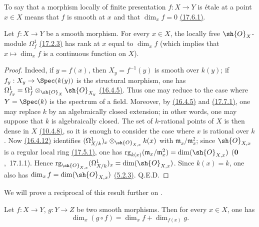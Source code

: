To say that a morphism locally of finite presentation $f:X\to Y$ is \'etale at a point $x\in X$ means that $f$ is smooth at $x$ and that $\dim_x f=0$ {\hyperlink{ega4.c04.thm.17-6-1}{(17.6.1)}}.

\begin{proposition}[17.10.2]
\label{IV.17.10.2}
Let $f:X\to Y$ be a smooth morphism.
For every $x\in X$, the locally free $\sh{O}_X$-module $\Omega^1_f$ {\hyperlink{ega4.c04.prop.17-2-3}{(17.2.3)}} has rank at $x$ equal to $\dim_x f$ (which implies that $x\mapsto\dim_x f$ is a continuous function on $X$).
\end{proposition}

\begin{proof}
Indeed, if $y=f(x)$, then $X_y=f^{-1}(y)$ is smooth over $k(y)$; if $f_y:X_y\to\Spec(k(y))$ is the structural morphism, one has $\Omega^1_{f_y}=\Omega^1_f\otimes_{\sh{O}_X}\sh{O}_{X_y}$ {\hyperlink{ega4.c04.prop.16-4-5}{(16.4.5)}}.
Thus one may reduce to the case where $Y=\Spec(k)$ is the spectrum of a field.
Moreover, by {\hyperlink{ega4.c04.prop.16-4-5}{(16.4.5)}} and {\hyperlink{ega4.c04.prop.17-7-1}{(17.7.1)}}, one may replace $k$ by an algebraically closed extension; in other words, one may suppose that $k$ is algebraically closed.
The set of $k$-rational points of $X$ is then dense in $X$ {\hyperlink{ega4.c04.cor.10-4-8}{(10.4.8)}}, so it is enough to consider the case where $x$ is rational over $k$.
Now {\hyperlink{ega4.c04.cor.16-4-12}{(16.4.12)}} identifies $(\Omega^1_{X/k})_x\otimes_{\sh{O}_{X,x}}k(x)$ with $\mathfrak{m}_x/\mathfrak{m}_x^2$; since $\sh{O}_{X,x}$ is a regular local ring {\hyperlink{ega4.c04.thm.17-5-1}{(17.5.1)}}, one has $\operatorname{rg}_{k(x)}(\mathfrak{m}_x/\mathfrak{m}_x^2)=\dim(\sh{O}_{X,x})$ ($\mathbf{0}$,~17.1.1).
Hence $\operatorname{rg}_{\sh{O}_{X,x}}(\Omega^1_{X/k})_x=\dim(\sh{O}_{X,x})$.
Since $k(x)=k$, one also has $\dim_x f=\dim(\sh{O}_{X,x})$ {\hyperlink{ega4.c04.cor.5-2-3}{(5.2.3)}}.
Q.E.D.
\end{proof}

We will prove a reciprocal of this result further on .


\begin{corollary}[17.10.3]
\label{IV.17.10.3}
Let $f:X\to Y$, $g:Y\to Z$ be two smooth morphisms.
Then for every $x\in X$, one has
\[
\label{IV.17.10.3.1}
\tag{17.10.3.1}
\dim_x(g\circ f) = \dim_x f + \dim_{f(x)} g.
\]
\end{corollary}


